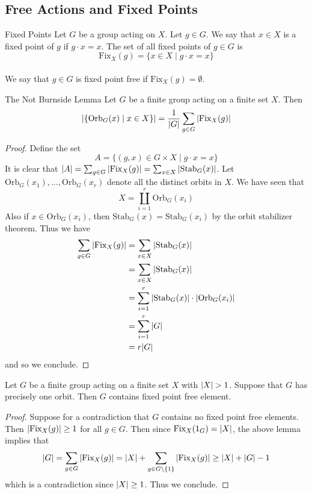 \documentclass[a4paper]{article}
\begin{document}
\subsection{Free Actions and Fixed Points}
\begin{defn}{Fixed Points}{} Let $G$ be a group acting on $X$. Let $g\in G$. We say that $x\in X$ is a fixed point of $g$ if $g\cdot x=x$. The set of all fixed points of $g\in G$ is $$\text{Fix}_X(g)=\{x\in X\;|\;g\cdot x=x\}$$~\\
We say that $g\in G$ is fixed point free if $\text{Fix}_X(g)=\emptyset$. 
\end{defn}

\begin{lmm}{The Not Burnside Lemma}{} Let $G$ be a finite group acting on a finite set $X$. Then $$\abs{\{\text{Orb}_G(x)\;|\;x\in X\}}=\frac{1}{\abs{G}}\sum_{g\in G}\abs{\text{Fix}_X(g)}$$ 
\begin{proof}
Define the set $$A=\{(g,x)\in G\times X\;|\;g\cdot x=x\}$$ It is clear that $\abs{A}=\sum_{g\in G}\abs{\text{Fix}_X(g)}=\sum_{x\in X}\abs{\text{Stab}_G(x)}$. Let $\text{Orb}_G(x_1),\dots,\text{Orb}_G(x_r)$ denote all the distinct orbits in $X$. We have seen that $$X=\coprod_{i=1}^r\text{Orb}_G(x_i)$$ Also if $x\in\text{Orb}_G(x_i)$, then $\text{Stab}_G(x)=\text{Stab}_G(x_i)$ by the orbit stabilizer theorem. Thus we have 
\begin{align*}
\sum_{g\in G}\abs{\text{Fix}_X(g)}&=\sum_{x\in X}\abs{\text{Stab}_G(x)}\\
&=\sum_{x\in X}\abs{\text{Stab}_G(x)}\\
&=\sum_{i=1}^r\abs{\text{Stab}_G(x)}\cdot\abs{\text{Orb}_G(x_i)}\\
&=\sum_{i=1}^r\abs{G}\\
&=r\abs{G}
\end{align*}
and so we conclude. 
\end{proof}
\end{lmm}

\begin{crl}{}{} Let $G$ be a finite group acting on a finite set $X$ with $\abs{X}>1$. Suppose that $G$ has precisely one orbit. Then $G$ contains fixed point free element. 
\begin{proof}
Suppose for a contradiction that $G$ contains no fixed point free elements. Then $\abs{\text{Fix}_X(g)}\geq 1$ for all $g\in G$. Then since $\text{Fix}_X(1_G)=\abs{X}$, the above lemma implies that $$\abs{G}=\sum_{g\in G}\abs{\text{Fix}_X(g)}=\abs{X}+\sum_{g\in G\setminus\{1\}}\abs{\text{Fix}_X(g)}\geq\abs{X}+\abs{G}-1$$ which is a contradiction since $\abs{X}\geq 1$. Thus we conclude. 
\end{proof}
\end{crl}
\end{document}
